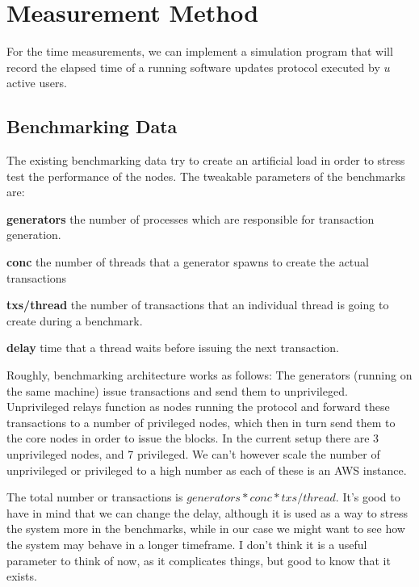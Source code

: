 \section{Measurement Method}
For the time measurements, we can implement a simulation program that will record the elapsed time of a running software updates protocol executed by $u$ active users.

\subsection{Benchmarking Data}
The existing benchmarking data try to create an artificial load in order to
stress test the performance of the nodes. The tweakable parameters of the benchmarks are:

\begin{description}
  \item \textbf{generators} the number of processes which are
    responsible for transaction generation.
  \item \textbf{conc} the number of threads that a generator spawns to create
    the actual transactions
  \item \textbf{txs/thread} the number of transactions that an individual thread
    is going to create during a benchmark.
  \item \textbf{delay} time that a thread waits before issuing the next
    transaction.
\end{description}

Roughly, benchmarking architecture works as follows:
The generators (running on the same machine) issue transactions and send them
to unprivileged. Unprivileged relays function as nodes running the protocol and
forward these transactions to a number of privileged nodes, which then in turn
send them to the core nodes in order to issue the blocks. In the current setup
there are 3 unprivileged nodes, and 7 privileged. We can't  however scale
the number of unprivileged or privileged to a high number as each of these is an
AWS instance.

The total number or transactions is $generators * conc * txs/thread$.
It's good to have in mind that we can change the delay, although it is used
as a way to stress the system more in the benchmarks, while in our case we might
want to see how the system may behave in a longer timeframe. I don't think it
is a useful parameter to think of now, as it complicates things, but good to
know that it exists.

